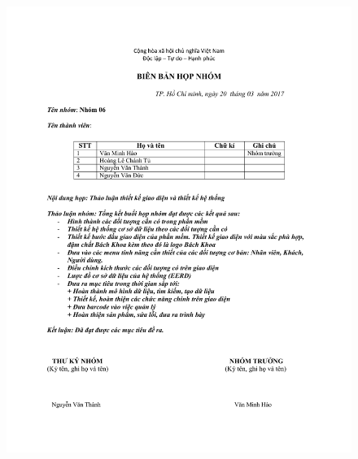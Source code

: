 \documentclass[12pt]{report}
\begin{document}
			\begin{figure}[H]
			\centering
			\includegraphics[scale=0.8]{images/hopnhomlan2.pdf}
			\end{figure}
\end{document}
